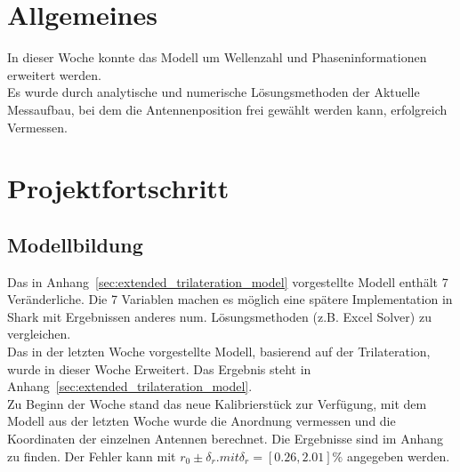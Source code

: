 \documentclass[a4paper,10pt,fleqn]{article}
\begin{document}
\setlength{\headheight}{36pt}

\begin{titlepage}



\end{titlepage}

\section[Allgemeines]{Allgemeines}
In dieser Woche konnte das Modell um Wellenzahl und Phaseninformationen erweitert werden.\\
Es wurde durch analytische und numerische Lösungsmethoden der Aktuelle Messaufbau, bei dem die Antennenposition frei gewählt werden kann, erfolgreich Vermessen.\\
 

\section[Fortschritt]{Projektfortschritt}


\subsection{Modellbildung}
Das in Anhang~\ref{sec:extended_trilateration_model} vorgestellte Modell enthält 7 Veränderliche. Die 7 Variablen machen es möglich eine spätere Implementation in Shark mit Ergebnissen anderes num. Lösungsmethoden (z.B. Excel Solver) zu vergleichen.\\
Das in der letzten Woche vorgestellte Modell, basierend auf der Trilateration, wurde in dieser Woche Erweitert. Das Ergebnis steht in Anhang~\ref{sec:extended_trilateration_model}.\\
Zu Beginn der Woche stand das neue Kalibrierstück zur Verfügung, mit dem Modell aus der letzten Woche wurde die Anordnung vermessen und die Koordinaten der einzelnen Antennen berechnet. Die Ergebnisse sind im Anhang~{} zu finden. Der Fehler kann mit $r_0\pm\delta_r. mit\delta_r=[0.26,2.01]\% $ angegeben werden.\\
\end{document}
